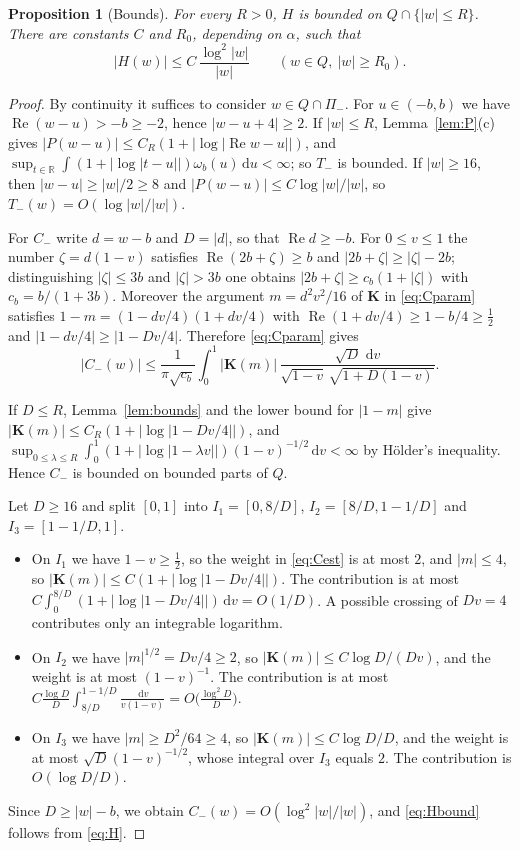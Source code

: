 \documentclass[11pt]{amsart}
\numberwithin{equation}{section}
\newtheorem{proposition}[theorem]{Proposition}
\theoremstyle{definition}
\theoremstyle{remark}
\newcommand{\R}{\mathbb{R}}
\newcommand{\Pim}{\Pi_{-}}
\newcommand{\dd}{\,\mathrm{d}}
\DeclareMathOperator{\re}{Re}
\newcommand{\Kc}{\mathbf{K}}
\begin{document}
\begin{proposition}[Bounds]\label{prop:bounds}
For every $R>0$, $H$ is bounded on $Q\cap\{|w|\le R\}$. There are constants
$C$ and $R_0$, depending on $\alpha$, such that
\begin{equation}\label{eq:Hbound}
|H(w)|\le C\,\frac{\log^2|w|}{|w|}\qquad(w\in Q,\ |w|\ge R_0).
\end{equation}
\end{proposition}

\begin{proof}
By continuity it suffices to consider $w\in Q\cap\Pim$. For $u\in(-b,b)$ we
have $\re(w-u)>-b\ge-2$, hence $|w-u+4|\ge2$. If $|w|\le R$,
Lemma~\ref{lem:P}(c) gives $|P(w-u)|\le C_R(1+|\log|\re w-u||)$, and
$\sup_{t\in\R}\int(1+|\log|t-u||)\omega_b(u)\dd u<\infty$; so $T_-$ is
bounded. If $|w|\ge16$, then $|w-u|\ge|w|/2\ge8$ and
$|P(w-u)|\le C\log|w|/|w|$, so $T_-(w)=O(\log|w|/|w|)$.

For $C_-$ write $d=w-b$ and $D=|d|$, so that $\re d\ge-b$. For $0\le v\le1$
the number $\zeta=d(1-v)$ satisfies $\re(2b+\zeta)\ge b$ and
$|2b+\zeta|\ge|\zeta|-2b$; distinguishing $|\zeta|\le3b$ and $|\zeta|>3b$ one
obtains $|2b+\zeta|\ge c_b(1+|\zeta|)$ with $c_b=b/(1+3b)$. Moreover the
argument $m=d^2v^2/16$ of $\Kc$ in \eqref{eq:Cparam} satisfies
$1-m=(1-dv/4)(1+dv/4)$ with $\re(1+dv/4)\ge1-b/4\ge\frac12$ and
$|1-dv/4|\ge|1-Dv/4|$. Therefore \eqref{eq:Cparam} gives
\begin{equation}\label{eq:Cest}
|C_-(w)|\le\frac{1}{\pi\sqrt{c_b}}\int_0^1|\Kc(m)|\,
\frac{\sqrt D\,\dd v}{\sqrt{1-v}\,\sqrt{1+D(1-v)}} .
\end{equation}

If $D\le R$, Lemma~\ref{lem:bounds} and the lower bound for $|1-m|$ give
$|\Kc(m)|\le C_R(1+|\log|1-Dv/4||)$, and
$\sup_{0\le\lambda\le R}\int_0^1(1+|\log|1-\lambda v||)(1-v)^{-1/2}\dd v<\infty$
by H\"older's inequality. Hence $C_-$ is bounded on bounded parts of $Q$.

Let $D\ge16$ and split $[0,1]$ into $I_1=[0,8/D]$, $I_2=[8/D,1-1/D]$ and
$I_3=[1-1/D,1]$.
\begin{itemize}
\item On $I_1$ we have $1-v\ge\frac12$, so the weight in \eqref{eq:Cest} is at
most $2$, and $|m|\le4$, so $|\Kc(m)|\le C(1+|\log|1-Dv/4||)$. The
contribution is at most
$C\int_0^{8/D}(1+|\log|1-Dv/4||)\dd v=O(1/D)$. A possible crossing of
$Dv=4$ contributes only an integrable logarithm.
\item On $I_2$ we have $|m|^{1/2}=Dv/4\ge2$, so
$|\Kc(m)|\le C\log D/(Dv)$, and the weight is at most $(1-v)^{-1}$. The
contribution is at most
$C\frac{\log D}{D}\int_{8/D}^{1-1/D}\frac{\dd v}{v(1-v)}=O\bigl(\frac{\log^2D}{D}\bigr)$.
\item On $I_3$ we have $|m|\ge D^2/64\ge4$, so $|\Kc(m)|\le C\log D/D$, and
the weight is at most $\sqrt D(1-v)^{-1/2}$, whose integral over $I_3$ equals
$2$. The contribution is $O(\log D/D)$.
\end{itemize}
Since $D\ge|w|-b$, we obtain $C_-(w)=O(\log^2|w|/|w|)$, and \eqref{eq:Hbound}
follows from \eqref{eq:H}.
\end{proof}
\end{document}
